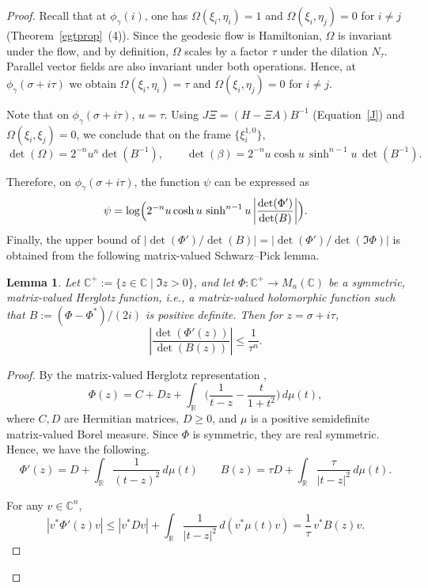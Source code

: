 \documentclass[a4paper, 12pt]{article}
\newtheorem{lem}[thm]{Lemma}
\begin{document}
\begin{proof}
Recall that at $\phi_\gamma(i)$, one has $\Omega(\xi_i,\eta_i)=1$ and $\Omega(\xi_i,\eta_j)=0$ for $i\ne j$ (Theorem~\ref{egtprop}~(4)). Since the geodesic flow is Hamiltonian, $\Omega$ is invariant under the flow, and by definition, $\Omega$ scales by a factor $\tau$ under the dilation $N_\tau$. Parallel vector fields are also invariant under both operations. Hence, at $\phi_\gamma(\sigma+i\tau)$ we obtain $\Omega(\xi_i,\eta_i)=\tau$ and $\Omega(\xi_i,\eta_j)=0$ for $i\ne j$.

Note that on $\phi_\gamma(\sigma+i \tau)$, $u=\tau$. Using $J\Xi = (H - \Xi A)B^{-1}$ (Equation~\ref{J}) and $\Omega(\xi_i,\xi_j)=0$, we conclude that on the frame $\{\xi_i^{1,0}\}$,
\[
\det(\Omega) = 2^{-n} u^n \det(B^{-1}), \qquad
\det(\beta) = 2^{-n}u \cosh u \, \sinh^{n-1} u \, \det(B^{-1}).
\]

Therefore, on $\phi_\gamma(\sigma+i\tau)$, the function $\psi$ can be expressed as
\begin{equation}
    \psi = \log\Bigl(2^{-n} u \cosh u \, \sinh^{n-1} u \left | \frac{\det(\Phi')}{\det(B)}\right | \Bigr) \label{psiasymp}.
\end{equation}
Finally, the upper bound of 
$\bigl|\det(\Phi')/\det(B)\bigr|
= \bigl|\det(\Phi')/\det(\Im \Phi)\bigr|$
is obtained from the following matrix-valued Schwarz--Pick lemma.

\begin{lem}
Let $\mathbb{C}^+ := \{z \in \mathbb{C} \mid \Im z > 0\}$, and let 
$\Phi : \mathbb{C}^+ \to M_n(\mathbb{C})$
be a symmetric, matrix-valued Herglotz function, i.e., a matrix-valued holomorphic function such that $B := (\Phi - \Phi^*)/(2i)$ is positive definite. Then for $z = \sigma + i\tau$,
\[
\left|\frac{\det(\Phi'(z))}{\det(B(z))}\right| \le \frac{1}{\tau^n}.
\]
\end{lem}

\begin{proof}
By the matrix-valued Herglotz representation \cite{GT00},
\[\Phi(z) = C + Dz + \int_{\mathbb{R}} \bigl( \frac{1}{t - z} - \frac{t}{1+t^2} \bigr)\, d\mu(t),\]
where $C,D$ are Hermitian matrices, $D \ge 0$, and $\mu$ is a positive semidefinite matrix-valued Borel measure. Since $\Phi$ is symmetric, they are real symmetric. Hence, we have the following.
\[\Phi'(z) = D + \int_{\mathbb{R}} \frac{1}{(t - z)^2}\, d\mu(t) \qquad B(z) = \tau D + \int_{\mathbb{R}} \frac{\tau}{|t - z|^2}\, d\mu(t).\]

For any $v \in \mathbb{C}^n$,
\[
|v^* \Phi'(z) v|
\le |v^* D v| + \int_{\mathbb{R}} \frac{1}{|t - z|^2}\, d(v^* \mu(t) v)
= \frac{1}{\tau} \, v^* B(z) v.
\]


\end{proof}
\end{proof}
\end{document}
